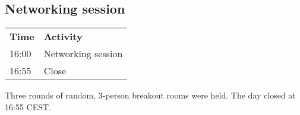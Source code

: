 \subsection{Networking session}

\begin{table}[!h]
    \centering
    \begin{tabular}{@{}
        |p{}
        |p{}
        |@{}}
    \rowcolor{Task32Blue2} \textbf{Time} & \textbf{Activity} \\
    16:00 & Networking session \\
    16:55 & Close \\
    \end{tabular}
    \label{tab:day1-networking}
\end{table}

Three rounds of random, 3-person breakout rooms were held. The day closed at 16:55 CEST.